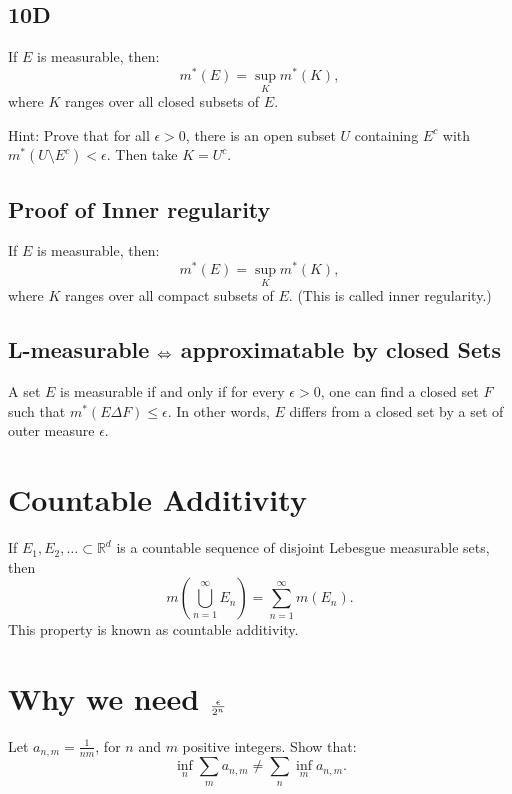 \documentclass[lang=cn,11pt]{template}
\begin{document}
\subsection*{10D}
If \( E \) is measurable, then:
\[
m^*(E) = \sup_K m^*(K),
\]
where \( K \) ranges over all closed subsets of \( E \).

\begin{remark}
Hint: Prove that for all \( \epsilon > 0 \), there is an open subset \( U \) containing \( E^c \) with \( m^*(U \setminus E^c) < \epsilon \). Then take \( K = U^c \).
\end{remark}




\subsection*{Proof of Inner regularity}
\begin{theorem}
If \( E \) is measurable, then:
\[
m^*(E) = \sup_K m^*(K),
\]
where \( K \) ranges over all compact subsets of \( E \). (This is called inner regularity.)
\end{theorem}





\subsection{L-measurable $\Leftrightarrow$ approximatable by closed Sets}
A set \( E \) is measurable if and only if for every \( \epsilon > 0 \), one can find a closed set \( F \) such that \( m^*(E \Delta F) \leq \epsilon \). In other words, \( E \) differs from a closed set by a set of outer measure \( \epsilon \).

\section{Countable Additivity}
\begin{theorem}
If \( E_1, E_2, \dots \subset \mathbb{R}^d \) is a countable sequence of disjoint Lebesgue measurable sets, then
\[
m\left( \bigcup_{n=1}^{\infty} E_n \right) = \sum_{n=1}^{\infty} m(E_n).
\]
This property is known as countable additivity.
\end{theorem}




\section{Why we need $\epsilon \over {2^n}$}
Let \( a_{n,m} = \frac{1}{nm} \), for \( n \) and \( m \) positive integers. Show that:
\[
\inf_n \sum_m a_{n,m} \neq \sum_n \inf_m a_{n,m}.
\]
\end{document}
